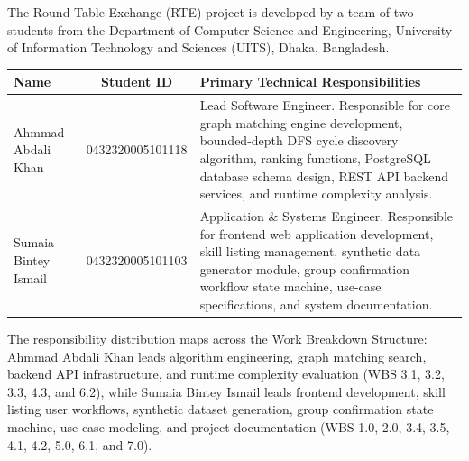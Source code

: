 The Round Table Exchange (RTE) project is developed by a team of two students from the Department of Computer Science and Engineering, University of Information Technology and Sciences (UITS), Dhaka, Bangladesh.

\vspace{12pt}

\begin{table}[h!]
\centering
\begin{tabularx}{\textwidth}{|l|c|X|}
\hline
\textbf{Name} & \textbf{Student ID} & \textbf{Primary Technical Responsibilities} \\
\hline
Ahmmad Abdali Khan & 0432320005101118 & Lead Software Engineer. Responsible for core graph matching engine development, bounded-depth DFS cycle discovery algorithm, ranking functions, PostgreSQL database schema design, REST API backend services, and runtime complexity analysis. \\
\hline
Sumaia Bintey Ismail & 0432320005101103 & Application \& Systems Engineer. Responsible for frontend web application development, skill listing management, synthetic data generator module, group confirmation workflow state machine, use-case specifications, and system documentation. \\
\hline
\end{tabularx}
\end{table}

\vspace{12pt}

The responsibility distribution maps across the Work Breakdown Structure: Ahmmad Abdali Khan leads algorithm engineering, graph matching search, backend API infrastructure, and runtime complexity evaluation (WBS 3.1, 3.2, 3.3, 4.3, and 6.2), while Sumaia Bintey Ismail leads frontend development, skill listing user workflows, synthetic dataset generation, group confirmation state machine, use-case modeling, and project documentation (WBS 1.0, 2.0, 3.4, 3.5, 4.1, 4.2, 5.0, 6.1, and 7.0).